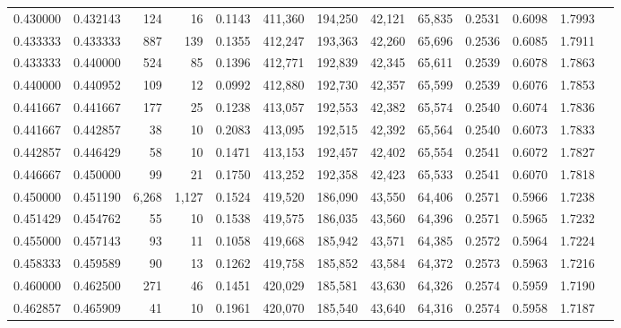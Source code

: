 \begin{tabular}{rrrrrrrrrrrrr}
0.430000 & 0.432143 &    124 &     16 &                                     0.1143 & 411,360 & 194,250 &  42,121 &  65,835 & 0.2531 & 0.6098 & 1.7993 \\
0.433333 & 0.433333 &    887 &    139 &                                     0.1355 & 412,247 & 193,363 &  42,260 &  65,696 & 0.2536 & 0.6085 & 1.7911 \\
0.433333 & 0.440000 &    524 &     85 &                                     0.1396 & 412,771 & 192,839 &  42,345 &  65,611 & 0.2539 & 0.6078 & 1.7863 \\
0.440000 & 0.440952 &    109 &     12 &                                     0.0992 & 412,880 & 192,730 &  42,357 &  65,599 & 0.2539 & 0.6076 & 1.7853 \\
0.441667 & 0.441667 &    177 &     25 &                                     0.1238 & 413,057 & 192,553 &  42,382 &  65,574 & 0.2540 & 0.6074 & 1.7836 \\
0.441667 & 0.442857 &     38 &     10 &                                     0.2083 & 413,095 & 192,515 &  42,392 &  65,564 & 0.2540 & 0.6073 & 1.7833 \\
0.442857 & 0.446429 &     58 &     10 &                                     0.1471 & 413,153 & 192,457 &  42,402 &  65,554 & 0.2541 & 0.6072 & 1.7827 \\
0.446667 & 0.450000 &     99 &     21 &                                     0.1750 & 413,252 & 192,358 &  42,423 &  65,533 & 0.2541 & 0.6070 & 1.7818 \\
0.450000 & 0.451190 &  6,268 &  1,127 &                                     0.1524 & 419,520 & 186,090 &  43,550 &  64,406 & 0.2571 & 0.5966 & 1.7238 \\
0.451429 & 0.454762 &     55 &     10 &                                     0.1538 & 419,575 & 186,035 &  43,560 &  64,396 & 0.2571 & 0.5965 & 1.7232 \\
0.455000 & 0.457143 &     93 &     11 &                                     0.1058 & 419,668 & 185,942 &  43,571 &  64,385 & 0.2572 & 0.5964 & 1.7224 \\
0.458333 & 0.459589 &     90 &     13 &                                     0.1262 & 419,758 & 185,852 &  43,584 &  64,372 & 0.2573 & 0.5963 & 1.7216 \\
0.460000 & 0.462500 &    271 &     46 &                                     0.1451 & 420,029 & 185,581 &  43,630 &  64,326 & 0.2574 & 0.5959 & 1.7190 \\
0.462857 & 0.465909 &     41 &     10 &                                     0.1961 & 420,070 & 185,540 &  43,640 &  64,316 & 0.2574 & 0.5958 & 1.7187 \\

\end{tabular}

